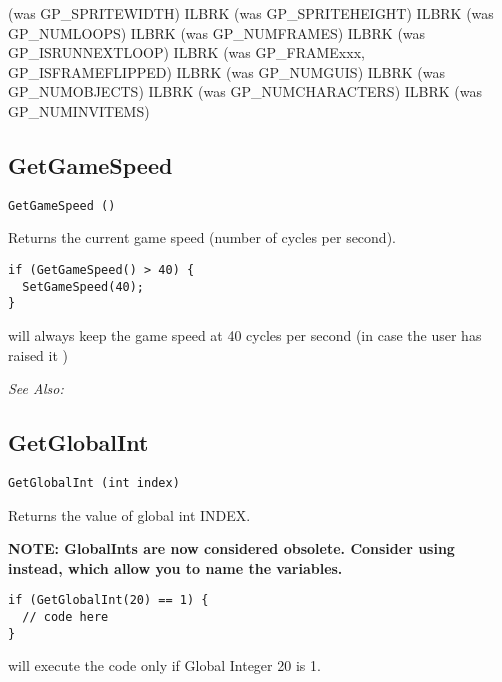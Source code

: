  (was GP_SPRITEWIDTH) ILBRK
 (was GP_SPRITEHEIGHT) ILBRK
 (was GP_NUMLOOPS) ILBRK
 (was GP_NUMFRAMES) ILBRK
 (was GP_ISRUNNEXTLOOP) ILBRK
 (was GP_FRAMExxx, GP_ISFRAMEFLIPPED) ILBRK
 (was GP_NUMGUIS) ILBRK
 (was GP_NUMOBJECTS) ILBRK
 (was GP_NUMCHARACTERS) ILBRK
(was GP_NUMINVITEMS)


\subsection{GetGameSpeed}\label{GetGameSpeed}%

\begin{verbatim}
GetGameSpeed ()
\end{verbatim}
Returns the current game speed (number of cycles per second).

\begin{verbatim}
if (GetGameSpeed() > 40) {
  SetGameSpeed(40);
}
\end{verbatim}
will always keep the game speed at 40 cycles per second (in case the user has raised it )

\it{See Also:} 


\subsection{GetGlobalInt}\label{GetGlobalInt}%

\begin{verbatim}
GetGlobalInt (int index)
\end{verbatim}
Returns the value of global int INDEX.

\bf{NOTE:} GlobalInts are now considered obsolete. Consider using
 instead, which allow you to name
the variables.

\begin{verbatim}
if (GetGlobalInt(20) == 1) {
  // code here
}
\end{verbatim}
will execute the code only if Global Integer 20 is 1.

